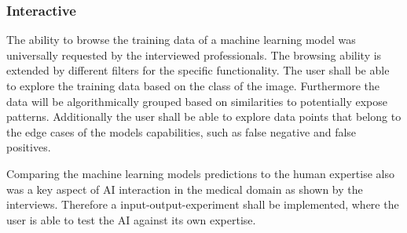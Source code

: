 \documentclass[11pt,a4paper,english]{scrreprt}
\begin{document}
\subsubsection*{Interactive}
\begin{description}[font=\normalfont\itshape]
    \item[Data Browsing:] The ability to browse the training data of a machine learning model was universally requested by the interviewed professionals. The browsing ability is extended by different filters for the specific functionality. The user shall be able to explore the training data based on the class of the image. Furthermore the data will be algorithmically grouped based on similarities to potentially expose patterns. Additionally the user shall be able to explore data points that belong to the edge cases of the models capabilities, such as false negative and false positives.
    \item[Experiment:] Comparing the machine learning models predictions to the human expertise also was a key aspect of AI interaction in the medical domain as shown by the interviews. Therefore a input-output-experiment shall be implemented, where the user is able to test the AI against its own expertise.
\end{description}
\end{document}
